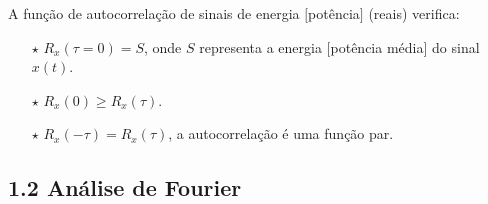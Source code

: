 \noindent A função de autocorrelação de sinais de energia $[$potência$]$ (reais) verifica:
\begin{enumerate}\footnotesize
    \item[$\pmb{\star}$] $R_x(\tau = 0) = S$, onde $S$ representa a energia $[$potência média$]$ do sinal $x(t)$.
    \item[$\pmb{\star}$] $R_x(0) \ge R_x(\tau)$.
    \item[$\pmb{\star}$] $R_x(-\tau) = R_x(\tau)$, a autocorrelação é uma função par. 
\end{enumerate}

\newpage
\subsection{1.2 Análise de Fourier}
\label{subsec:fourier-analysis}

